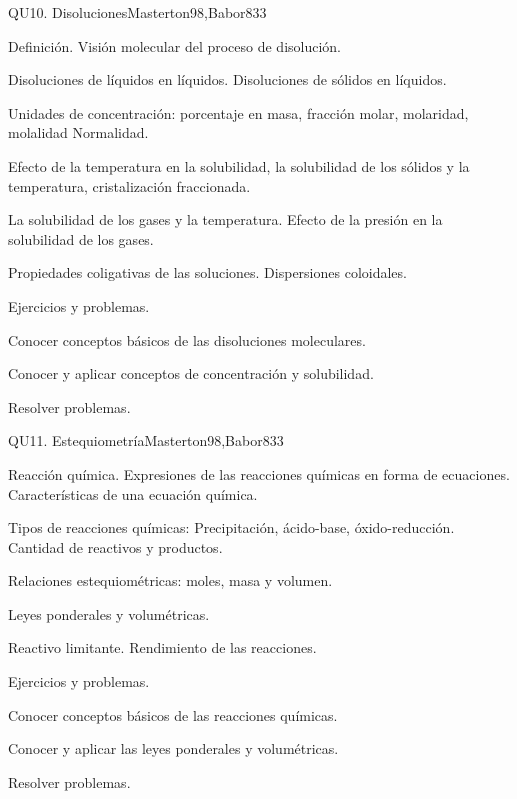 \begin{syllabus}
\begin{unit}{QU10. Disoluciones}{Masterton98,Babor83}{3}
\begin{topics}
      \item Definición. Visión molecular del proceso de disolución.
      \item Disoluciones de líquidos en líquidos. Disoluciones de sólidos en líquidos.
      \item Unidades de concentración: porcentaje en masa, fracción molar, molaridad, molalidad Normalidad.
      \item Efecto de la temperatura en la solubilidad, la solubilidad de los sólidos y la temperatura, cristalización fraccionada.
      \item La solubilidad de los gases y la temperatura. Efecto  de la presión en la solubilidad de los gases.
      \item Propiedades coligativas de las soluciones. Dispersiones coloidales.
      \item Ejercicios y problemas.
    \end{topics}

   \begin{learningoutcomes}
      \item Conocer conceptos básicos de las disoluciones moleculares.
      \item Conocer y aplicar conceptos de concentración y solubilidad.
      \item Resolver problemas.
   \end{learningoutcomes}
\end{unit}

\begin{unit}{QU11. Estequiometría}{Masterton98,Babor83}{3}
\begin{topics}
      \item Reacción química. Expresiones de las reacciones químicas en forma de ecuaciones. Características de una ecuación química.
      \item Tipos de reacciones químicas: Precipitación, ácido-base, óxido-reducción. Cantidad de reactivos y productos.
      \item Relaciones estequiométricas: moles, masa y volumen.
      \item Leyes ponderales y volumétricas.
      \item Reactivo limitante. Rendimiento de las reacciones.
      \item Ejercicios y problemas.
    \end{topics}

   \begin{learningoutcomes}
      \item Conocer conceptos básicos de las reacciones químicas.
      \item Conocer y aplicar las leyes ponderales y volumétricas.
      \item Resolver problemas.
   \end{learningoutcomes}
\end{unit}

\begin{coursebibliography}
\end{coursebibliography}
\end{syllabus}
